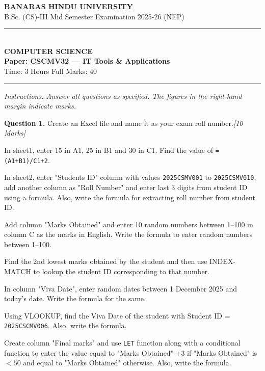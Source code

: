 \documentclass[11pt,a4paper]{article}
\newcommand{\pts}[1]{\hfill   \textit{[#1]}}
\begin{document}
\begin{center}
  {\large\bfseries BANARAS HINDU UNIVERSITY}\\[2pt]
  {\normalsize B.Sc. (CS)-III Mid Semester Examination 2025-26 (NEP)}\\[6pt]
  \rule{0.8\linewidth}{0.5pt}\\[6pt]
  {\large\bfseries COMPUTER SCIENCE}\\[4pt]
  {\large\bfseries Paper: CSCMV32 --- IT Tools \& Applications}\\[4pt]
  {\normalsize Time: 3 Hours \hfill Full Marks: 40}
\end{center}
\rule{\linewidth}{0.4pt}
\smallskip



\noindent   \textit{Instructions: Answer all questions as specified. The figures in the right-hand margin indicate marks.}
\bigskip




\noindent   \textbf{Question 1.} Create an Excel file and name it as your exam roll number.\pts{10 Marks}

\begin{parts}
  \item In sheet1, enter 15 in A1, 25 in B1 and 30 in C1. Find the value of   \texttt{=(A1+B1)/C1+2}.
  \item In sheet2, enter "Students ID" column with values   \texttt{2025CSMV001} to   \texttt{2025CSMV010}, add another column as "Roll Number" and enter last 3 digits from student ID using a formula. Also, write the formula for extracting roll number from student ID.
  \item Add column "Marks Obtained" and enter 10 random numbers between 1--100 in column C as the marks in English. Write the formula to enter random numbers between 1--100.
  \item Find the 2nd lowest marks obtained by the student and then use INDEX-MATCH to lookup the student ID corresponding to that number.
  \item In column "Viva Date", enter random dates between 1 December 2025 and today's date. Write the formula for the same.
  \item Using VLOOKUP, find the Viva Date of the student with Student ID =   \texttt{2025CSCMV006}. Also, write the formula.
  \item Create column "Final marks" and use   \texttt{LET} function along with a conditional function to enter the value equal to "Marks Obtained" $+ 3$ if "Marks Obtained" is $< 50$ and equal to "Marks Obtained" otherwise. Also, write the formula.
\end{parts}
\end{document}
